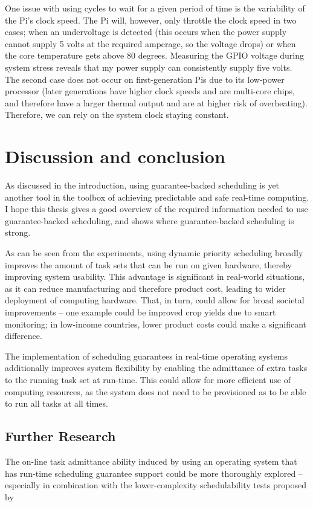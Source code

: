 \documentclass[twoside]{uva-inf-bachelor-thesis}
\begin{document}
One issue with using cycles to wait for a given period of time is the variability of the Pi's clock speed. The Pi will, however, only throttle the clock speed in two cases; when an undervoltage is detected (this occurs when the power supply cannot supply 5 volts at the required amperage, so the voltage drops) or when the core temperature gets above 80 degrees\cite{rpi:gpuclockpower}. Measuring the GPIO voltage during system stress reveals that my power supply can consistently supply five volts. The second case does not occur on first-generation Pis due to its low-power processor (later generations have higher clock speeds and are multi-core chips, and therefore have a larger thermal output and are at higher risk of overheating). Therefore, we can rely on the system clock staying constant.


\chapter{Discussion and conclusion}
As discussed in the introduction, using guarantee-backed scheduling is yet another tool in the toolbox of achieving predictable and safe real-time computing. I hope this thesis gives a good overview of the required information needed to use guarantee-backed scheduling, and shows where guarantee-backed scheduling is strong.

As can be seen from the experiments, using dynamic priority scheduling broadly improves the amount of task sets that can be run on given hardware, thereby improving system usability. This advantage is significant in real-world situations, as it can reduce manufacturing and therefore product cost, leading to wider deployment of computing hardware. That, in turn, could allow for broad societal improvements -- one example could be improved crop yields due to smart monitoring; in low-income countries, lower product costs could make a significant difference.

The implementation of scheduling guarantees in real-time operating systems additionally improves system flexibility by enabling the admittance of extra tasks to the running task set at run-time. This could allow for more efficient use of computing resources, as the system does not need to be provisioned as to be able to run all tasks at all times.

\section{Further Research}
The on-line task admittance ability induced by using an operating system that has run-time scheduling guarantee support could be more thoroughly explored -- especially in combination with the lower-complexity schedulability tests proposed by \textcite{Albers}

{
    \hfuzz=8pt
    \printbibliography
}
\end{document}
